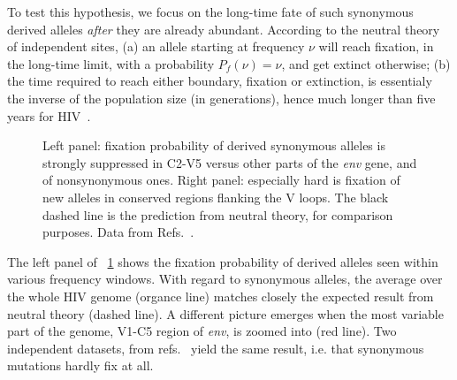 \documentclass[12pt,a4paper,notitlepage,onecolumn]{article}
\newcommand{\env}{\textit{env}}
\begin{document}
To test this hypothesis, we focus on the long-time fate of such synonymous
derived alleles {\it after} they are already abundant. According to the neutral
theory of independent sites, (a) an allele starting at frequency $\nu$ will
reach fixation, in the long-time limit, with a probability $P_f(\nu) = \nu$, and
get extinct otherwise; (b) the time required to reach either boundary, fixation
or extinction, is essentialy the inverse of the population size (in
generations), hence much longer than five years for HIV~\citep{boltz_ultrasensitive_2012}.
\begin{figure}
\begin{center}
\caption{Left panel: fixation probability of derived synonymous alleles is strongly
suppressed in C2-V5 versus other parts of the {\it env} gene, and of
nonsynonymous ones.
Right panel: especially hard is fixation of new alleles in conserved regions flanking the V
loops. The black dashed line is the prediction from neutral
theory, for comparison purposes. Data from
Refs.~\cite{shankarappa_consistent_1999, bunnik_autologous_2008}.}
\label{fig:fixp}
\end{center}
\end{figure}

The left panel of \figurename~\ref{fig:fixp} shows the fixation probability of
derived alleles seen within various frequency windows. With regard to synonymous
alleles, the average over the whole HIV genome (organce line) matches closely
the expected result from neutral theory (dashed line). A different picture
emerges when the most variable part of the genome, V1-C5 region of \env{},
is zoomed into (red line). Two independent datasets, from
refs.~\citep{shankarappa_consistent_1999, bunnik_autologous_2008} yield the same
result, i.e. that synonymous mutations hardly fix at all.
\end{document}
